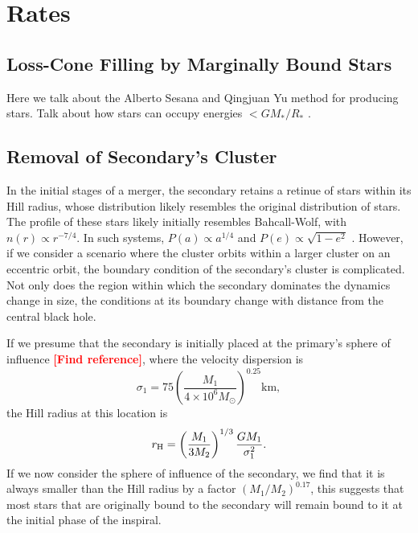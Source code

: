 \documentclass[a4paper,twocolumn]{emulateapj}
\newcommand{\colr}[1]{{\bf \textcolor{red}{[#1]}}}
\begin{document}
\section{Rates}

\subsection{Loss-Cone Filling by Marginally Bound Stars}

Here we talk about the Alberto Sesana and Qingjuan Yu method for producing stars. Talk about how stars can occupy energies $< G M_{\ast}/R_{\ast}$ \citep[response to][]{Yu:2003hs}.

\subsection{Removal of Secondary's Cluster}
In the initial stages of a merger, the secondary retains a retinue of stars within its Hill radius, whose distribution likely resembles the original distribution of stars. The profile of these stars likely initially resembles Bahcall-Wolf, with $n(r) \propto r^{-7/4}$. In such systems, $P(a) \propto a^{1/4}$ and $P(e) \propto \sqrt{1-e^2}$ \citep{Ivanov:2005io}. However, if we consider a scenario where the cluster orbits within a larger cluster on an eccentric orbit, the boundary condition of the secondary's cluster is complicated. Not only does the region within which the secondary dominates the dynamics change in size, the conditions at its boundary change with distance from the central black hole.

If we presume that the secondary is initially placed at the primary's sphere of influence \colr{Find reference}, where the velocity dispersion is
\begin{equation}
\sigma_{1} = 75 \left(\frac{M_{1}}{4 \times 10^{6} M_{\odot}}\right)^{0.25} \textrm{km}\label{eq:sigma},
\end{equation}
the Hill radius at this location is
\begin{equation}
r_{\rm H} = \left(\frac{M_{1}}{3 M_{2}}\right)^{1/3} \frac{G M_{1}}{\sigma_{1}^{2}}.
\end{equation}
If we now consider the sphere of influence of the secondary, we find that it is always smaller than the Hill radius by a factor $(M_{1}/M_{2})^{0.17}$, this suggests that most stars that are originally bound to the secondary will remain bound to it at the initial phase of the inspiral.
\end{document}

